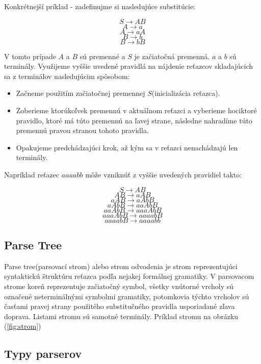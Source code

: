 \documentclass[12pt,a4paper]{report}
\theoremstyle{definition}
\theoremstyle{remark}
\begin{document}
\noindent Konkrétnejší príklad - zadefinujme si nasledujúce substitúcie:

$$ S \to AB $$
$$ A \to a $$
$$ A \to aA $$
$$ B \to b $$
$$ B \to bB $$

V tomto prípade $A$ a $B$ sú premenné a $S$ je začiatočná premenná. $a$ a $b$ sú terminály. Využijeme vyššie uvedené pravidlá na nájdenie reťazcov skladajúcich sa z terminálov nasledujúcim spôsobom:
\begin{itemize}
\item Začneme použitím začiatočnej premennej $S$(inicializácia reťazca).
\item Zoberieme ktorúkoľvek premennú v aktuálnom reťazci a vyberieme hociktoré pravidlo, ktoré má túto premennú na ľavej strane, následne nahradíme túto premennú pravou stranou tohoto pravidla.
\item Opakujeme predchádzajúci krok, až kým sa v reťazci nenachádzajú len terminály.
\end{itemize}

Napríklad reťazec $aaaabb$ môže vzniknúť z vyššie uvedených pravidiel takto:

$$ S \to AB $$
$$ AB \to aAB $$
$$ aAB \to aAbB $$
$$ aAbB \to aaAbB $$
$$ aaAbB \to aaaAbB $$
$$ aaaAbB \to aaaabB $$
$$ aaaabB \to aaaabb $$
\subsection{Parse Tree}
Parse tree(parsovací strom) alebo strom odvodenia je strom reprezentujúci syntaktickú štruktúru reťazca podľa nejakej formálnej gramatiky. V parsovacom strome koreň reprezentuje začiatočný symbol, všetky vnútorné vrcholy sú označené neterminálnými symbolmi gramatiky, potomkovia týchto vrcholov sú časťami pravej strany použitého substitučného pravidla usporiadané zľava doprava. Listami stromu sú samotné terminály. Príklad stromu na obrázku (\ref{fig:strom})
\subsection{Typy parserov}
\end{document}
